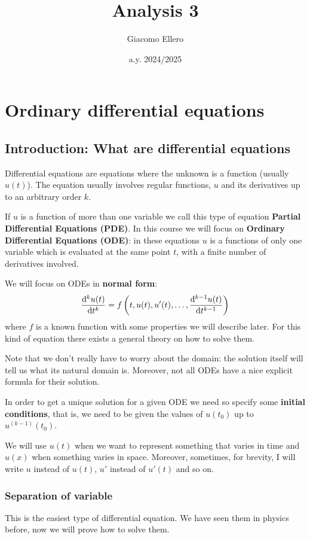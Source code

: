 \documentclass[12pt]{extarticle}
\title{Analysis 3}
\author{Giacomo Ellero}
\date{a.y. 2024/2025}
\begin{document}
\firstpage

\section{Ordinary differential equations}

\subsection{Introduction: What are differential equations}

Differential equations are equations where the unknown is a function (usually $u(t)$).
The equation usually involves regular functions, $u$ and its derivatives up to an arbitrary order $k$.

If $u$ is a function of more than one variable we call this type of equation \textbf{Partial Differential Equations (PDE)}.
In this course we will focus on \textbf{Ordinary Differential Equations (ODE)}:
in these equations $u$ is a functions of only one variable which is evaluated at the same point $t$, with a finite number of derivatives involved.

We will focus on ODEs in \textbf{normal form}:
\begin{equation}
    \label{eq:normal-form}
    \dv[k]{u(t)}{t} = f\left( t, u(t), u'(t), \dots, \dv[k-1]{u(t)}{t} \right)
\end{equation}
where $f$ is a known function with some properties we will describe later.
For this kind of equation there exists a general theory on how to solve them.

Note that we don't really have to worry about the domain: the solution itself will tell us what its natural domain is.
Moreover, not all ODEs have a nice explicit formula for their solution.

In order to get a unique solution for a given ODE we need so specify some \textbf{initial conditions}, that is, we need to be given the values of $u(t_0)$ up to $u^{(k-1)}(t_0)$.

We will use $u(t)$ when we want to represent something that varies in time and $u(x)$ when something varies in space.
Moreover, sometimes, for brevity, I will write $u$ instead of $u(t)$, $u'$ instead of $u'(t)$ and so on.

\subsubsection{Separation of variable}

This is the easiest type of differential equation. We have seen them in physics before, now we will prove how to solve them.
\end{document}
